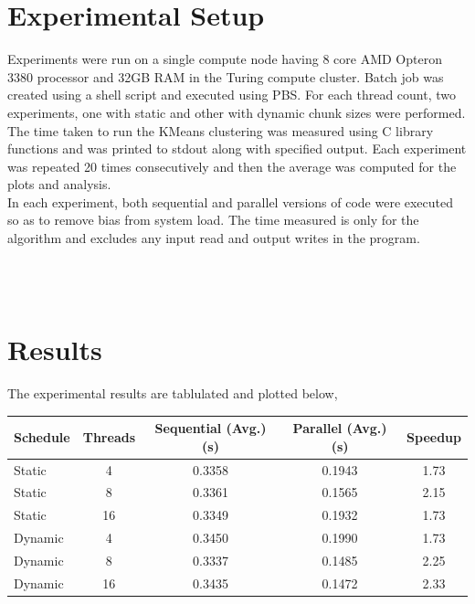 \documentclass[11pt,a4paper,oneside]{article}
\begin{document}
	\section{Experimental Setup}
	Experiments were run on a single compute node having 8 core AMD Opteron 3380 processor and 32GB RAM in the Turing compute cluster. Batch job was created using a shell script and executed using PBS. For each thread count, two experiments, one with static and other with dynamic chunk sizes were performed.\\
	\newline
	The time taken to run the KMeans clustering was measured using C library functions and was printed to stdout along with specified output. Each experiment was repeated 20 times consecutively and then the average was computed for the plots and analysis. \\
	\newline
	In each experiment, both sequential and parallel versions of code were executed so as to remove bias from system load. The time measured is only for the algorithm and excludes any input read and output writes in the program.\\
	\newline
	
	\begin{verbatim}
					
							
	\end{verbatim}
	
	\section{Results}
	
	The experimental results are tablulated and plotted below,
	
	  \begin{center}
		\begin{tabular}{|l|c|c|c|c|}
			\hline 
			\textbf{Schedule} & \textbf{Threads}  & \textbf{Sequential (Avg.) (s)} & \textbf{Parallel (Avg.) (s)} & \textbf{Speedup} \\
			\hline
		    Static & 4 &  0.3358 & 0.1943 & 1.73\\ 
			\hline 
		     Static & 8 &  0.3361 & 0.1565 & 2.15\\
			\hline 
			 Static & 16 &  0.3349 & 0.1932 & 1.73\\
			\hline 
			 Dynamic & 4 &  0.3450 & 0.1990 & 1.73\\ 
			\hline 
			Dynamic & 8 &  0.3337 & 0.1485 & 2.25 \\
			\hline 
			Dynamic & 16 &  0.3435 & 0.1472 & 2.33\\
			\hline 
		\end{tabular}
	\end{center}
	
\end{document}
